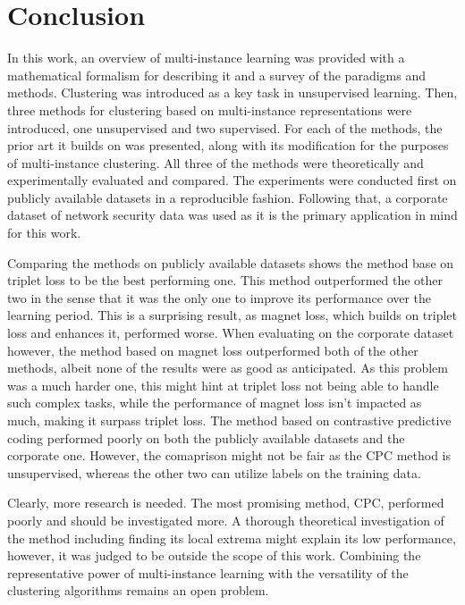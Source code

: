 \chapter*{Conclusion}

In this work, an overview of multi-instance learning was provided with a mathematical formalism for describing it and a survey of the paradigms and methods. Clustering was introduced as a key task in unsupervised learning. Then, three methods for clustering based on multi-instance representations were introduced, one unsupervised and two supervised. For each of the methods, the prior art it builds on was presented, along with its modification for the purposes of multi-instance clustering. All three of the methods were theoretically and experimentally evaluated and compared. The experiments were conducted first on publicly available datasets in a reproducible fashion. Following that, a corporate dataset of network security data was used as it is the primary application in mind for this work.

Comparing the methods on publicly available datasets shows the method base on triplet loss to be the best performing one. This method outperformed the other two in the sense that it was the only one to improve its performance over the learning period. This is a surprising result, as magnet loss, which builds on triplet loss and enhances it, performed worse. When evaluating on the corporate dataset however, the method based on magnet loss outperformed both of the other methods, albeit none of the results were as good as anticipated. As this problem was a much harder one, this might hint at triplet loss not being able to handle such complex tasks, while the performance of magnet loss isn't impacted as much, making it surpass triplet loss. The method based on contrastive predictive coding performed poorly on both the publicly available datasets and the corporate one. However, the comaprison might not be fair as the CPC method is unsupervised, whereas the other two can utilize labels on the training data.

Clearly, more research is needed. The most promising method, CPC, performed poorly and should be investigated more. A thorough theoretical investigation of the method including finding its local extrema might explain its low performance, however, it was judged to be outside the scope of this work. Combining the representative power of multi-instance learning with the versatility of the clustering algorithms remains an open problem.
